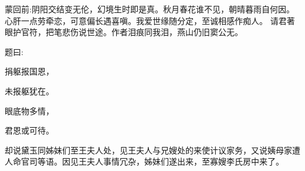 
\begin{parag}
    \begin{note}蒙回前:阴阳交结变无伦，幻境生时即是真。秋月春花谁不见，朝晴暮雨自何因。心肝一点劳牵恋，可意偏长遇喜嗔。我爱世缘随分定，至诚相感作痴人。
        请君著眼护官符，把笔悲伤说世途。作者泪痕同我泪，燕山仍旧窦公无。\end{note}
\end{parag}


\begin{parag}
    题曰:
\end{parag}


\begin{poem}
    \begin{pl}捐躯报国恩，\end{pl}
    \begin{pl}未报躯犹在。\end{pl}

    \begin{pl}眼底物多情，\end{pl}
    \begin{pl}君恩或可待。\end{pl}
\end{poem}


\begin{parag}
    却说黛玉同姊妹们至王夫人处，见王夫人与兄嫂处的来使计议家务，又说姨母家遭人命官司等语。因见王夫人事情冗杂，姊妹们遂出来，至寡嫂李氏房中来了。
\end{parag}


